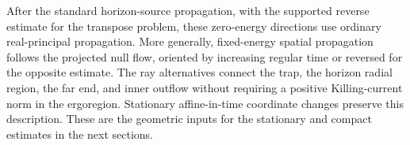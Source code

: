 After the standard horizon-source propagation, with the supported
reverse estimate for the transpose problem, these zero-energy
directions use ordinary real-principal propagation.  More
generally, fixed-energy spatial propagation follows the projected
null flow, oriented by increasing regular time or reversed for
the opposite estimate.  The ray alternatives connect the trap,
the horizon radial region, the far end, and inner outflow without
requiring a positive Killing-current norm in the ergoregion.
Stationary affine-in-time coordinate changes preserve this
description.  These are the geometric inputs for the stationary
and compact estimates in the next sections.
